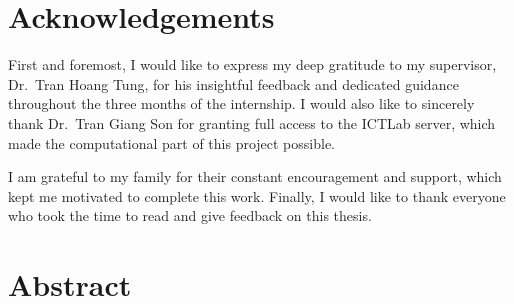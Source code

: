 \documentclass[12pt,a4paper]{report}
\begin{document}

\chapter*{Acknowledgements}

First and foremost, I would like to express my deep gratitude to my supervisor,
Dr.\ Tran Hoang Tung, for his insightful feedback and dedicated guidance
throughout the three months of the internship. I would also like to sincerely
thank Dr.\ Tran Giang Son for granting full access to the ICTLab server, which
made the computational part of this project possible.

I am grateful to my family for their constant encouragement and support, which
kept me motivated to complete this work. Finally, I would like to thank everyone
who took the time to read and give feedback on this thesis.

\chapter*{Abstract}
\end{document}
